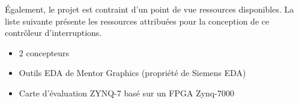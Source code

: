 Également, le projet est contraint d'un point de vue ressources disponibles.
La liste suivante présente les ressources attribuées pour la conception de ce contrôleur d'interruptions.

\begin{itemize}
	\item 2 concepteurs
	\item Outils EDA de Mentor Graphics (propriété de Siemens EDA)
	\item Carte d'évaluation ZYNQ-7 basé sur un FPGA Zynq-7000
\end{itemize}
